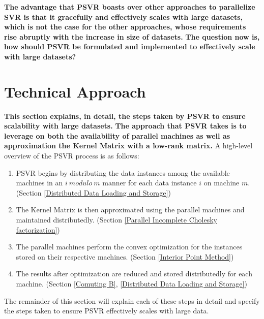 \documentclass[12pt]{article}
\begin{document}
\newline\newline
{\bf The advantage that PSVR boasts over other approaches to parallelize SVR is that it gracefully and effectively scales with large datasets, which is not the case for the other approaches, whose requirements rise abruptly with the increase in size of datasets.} 
\newline\newline
{\bf The question now is, how should PSVR be formulated and implemented to effectively scale with large datasets?}
\cleardoublepage
 \section{Technical Approach}
 \label{Technical Approach}
 {\bf This section explains, in detail, the steps taken by PSVR to ensure scalability with large datasets.}
 \newline\newline
{\bf The approach that PSVR takes is to leverage on both the availability of parallel machines as well as approximation the Kernel Matrix with a low-rank matrix.}
\newline\newline
A high-level overview of the PSVR process is as follows:
\begin{enumerate}
\item PSVR begins by distributing the data instances among the available machines in an $i\ modulo\ m$ manner for each data instance $i$ on machine $m$. (Section \ref{Distributed Data Loading and Storage})
\item The Kernel Matrix is then approximated using the parallel machines and maintained distributedly. (Section \ref{Parallel Incomplete Cholesky factorization})
\item The parallel machines perform the convex optimization for the instances stored on their respective machines. (Section \ref{Interior Point Method})
\item The results after optimization are reduced and stored distributedly for each machine. (Section \ref{Comuting B},  \ref{Distributed Data Loading and Storage})
\end{enumerate}
 The remainder of this section will explain each of these steps in detail and specify the steps taken to ensure PSVR effectively scales with large data.
\end{document}
